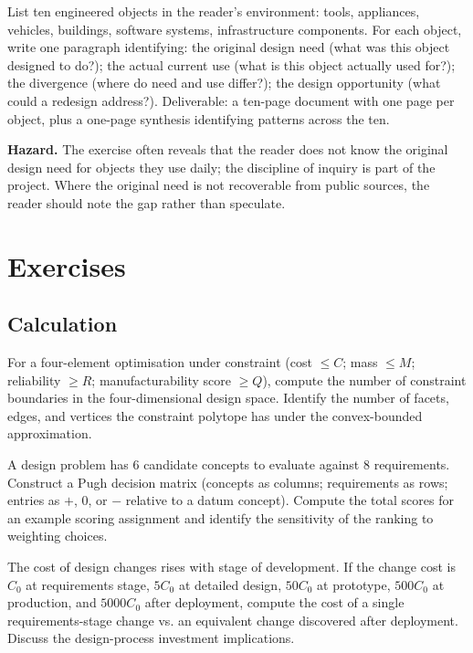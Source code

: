 \begin{project}
List ten engineered objects in the reader's environment: tools, appliances, vehicles, buildings, software systems, infrastructure components. For each object, write one paragraph identifying: the original design need (what was this object designed to do?); the actual current use (what is this object actually used for?); the divergence (where do need and use differ?); the design opportunity (what could a redesign address?). Deliverable: a ten-page document with one page per object, plus a one-page synthesis identifying patterns across the ten.

\textbf{Hazard.} The exercise often reveals that the reader does not know the original design need for objects they use daily; the discipline of inquiry is part of the project. Where the original need is not recoverable from public sources, the reader should note the gap rather than speculate.
\end{project}

\section{Exercises}

\subsection*{Calculation}

\begin{exercise}
For a four-element optimisation under constraint (cost $\leq C$; mass $\leq M$; reliability $\geq R$; manufacturability score $\geq Q$), compute the number of constraint boundaries in the four-dimensional design space. Identify the number of facets, edges, and vertices the constraint polytope has under the convex-bounded approximation.
\end{exercise}

\begin{exercise}
A design problem has 6 candidate concepts to evaluate against 8 requirements. Construct a Pugh decision matrix (concepts as columns; requirements as rows; entries as $+$, $0$, or $-$ relative to a datum concept). Compute the total scores for an example scoring assignment and identify the sensitivity of the ranking to weighting choices.
\end{exercise}

\begin{exercise}
The cost of design changes rises with stage of development. If the change cost is $C_0$ at requirements stage, $5 C_0$ at detailed design, $50 C_0$ at prototype, $500 C_0$ at production, and $5000 C_0$ after deployment, compute the cost of a single requirements-stage change vs. an equivalent change discovered after deployment. Discuss the design-process investment implications.
\end{exercise}


